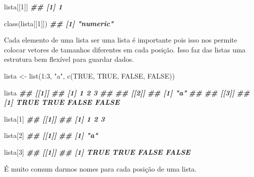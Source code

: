 \documentclass[
]{book}
\newenvironment{Shaded}{\begin{snugshade}}{\end{snugshade}}
\newcommand{\AttributeTok}[1]{\textcolor[rgb]{0.77,0.63,0.00}{#1}}
\newcommand{\ConstantTok}[1]{\textcolor[rgb]{0.00,0.00,0.00}{#1}}
\newcommand{\DecValTok}[1]{\textcolor[rgb]{0.00,0.00,0.81}{#1}}
\newcommand{\DocumentationTok}[1]{\textcolor[rgb]{0.56,0.35,0.01}{\textbf{\textit{#1}}}}
\newcommand{\FunctionTok}[1]{\textcolor[rgb]{0.00,0.00,0.00}{#1}}
\newcommand{\NormalTok}[1]{#1}
\newcommand{\OtherTok}[1]{\textcolor[rgb]{0.56,0.35,0.01}{#1}}
\newcommand{\SpecialCharTok}[1]{\textcolor[rgb]{0.00,0.00,0.00}{#1}}
\newcommand{\StringTok}[1]{\textcolor[rgb]{0.31,0.60,0.02}{#1}}
\begin{document}
\begin{Shaded}
\begin{Highlighting}[]
\NormalTok{lista[[}\DecValTok{1}\NormalTok{]]}
\DocumentationTok{\#\# [1] 1}

\FunctionTok{class}\NormalTok{(lista[[}\DecValTok{1}\NormalTok{]])}
\DocumentationTok{\#\# [1] "numeric"}
\end{Highlighting}
\end{Shaded}

Cada elemento de uma lista ser uma lista é importante pois isso nos permite colocar vetores de tamanhos diferentes em cada posição. Isso faz das listas uma estrutura bem flexível para guardar dados.

\begin{Shaded}
\begin{Highlighting}[]
\NormalTok{lista }\OtherTok{\textless{}{-}} \FunctionTok{list}\NormalTok{(}\DecValTok{1}\SpecialCharTok{:}\DecValTok{3}\NormalTok{, }\StringTok{"a"}\NormalTok{, }\FunctionTok{c}\NormalTok{(}\ConstantTok{TRUE}\NormalTok{, }\ConstantTok{TRUE}\NormalTok{, }\ConstantTok{FALSE}\NormalTok{, }\ConstantTok{FALSE}\NormalTok{))}

\NormalTok{lista}
\DocumentationTok{\#\# [[1]]}
\DocumentationTok{\#\# [1] 1 2 3}
\DocumentationTok{\#\# }
\DocumentationTok{\#\# [[2]]}
\DocumentationTok{\#\# [1] "a"}
\DocumentationTok{\#\# }
\DocumentationTok{\#\# [[3]]}
\DocumentationTok{\#\# [1]  TRUE  TRUE FALSE FALSE}

\NormalTok{lista[}\DecValTok{1}\NormalTok{]}
\DocumentationTok{\#\# [[1]]}
\DocumentationTok{\#\# [1] 1 2 3}

\NormalTok{lista[}\DecValTok{2}\NormalTok{]}
\DocumentationTok{\#\# [[1]]}
\DocumentationTok{\#\# [1] "a"}

\NormalTok{lista[}\DecValTok{3}\NormalTok{]}
\DocumentationTok{\#\# [[1]]}
\DocumentationTok{\#\# [1]  TRUE  TRUE FALSE FALSE}
\end{Highlighting}
\end{Shaded}

É muito comum darmos nomes para cada posição de uma lista.

\begin{Shaded}
\end{Shaded}
\end{document}
